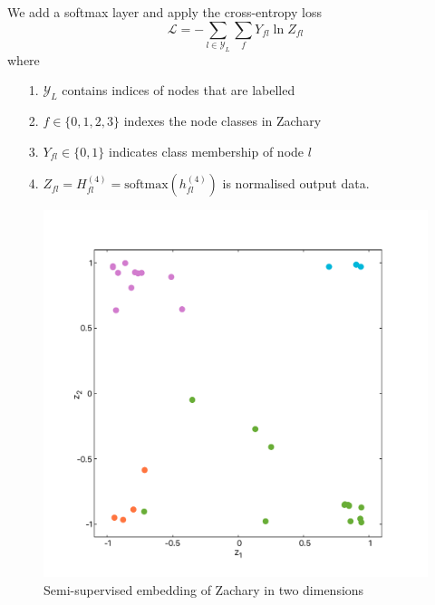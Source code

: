\documentclass[mathserif,10pt]{beamer}
\begin{document}
\begin{frame}
We add a softmax layer and apply the cross-entropy loss
\begin{equation}
  \mathcal{L} = -\sum_{l \in \mathcal{Y}_L} \sum_f Y_{fl} \ln Z_{fl}
\end{equation}
where 
\begin{itemize}
  \item[1.] $\mathcal{Y}_L$ contains indices of nodes that are labelled
  \item[2.] $f \in \lbrace 0, 1, 2, 3 \rbrace$ indexes the node classes in Zachary 
  \item[3.] $Y_{fl} \in \lbrace 0, 1\rbrace$ indicates class membership of node $l$
  \item[4.] $Z_{fl} = H^{(4)}_{fl} = \text{softmax}(h_{fl}^{(4)})$ is normalised output data.
\end{itemize}
\end{frame}

\begin{frame}
  \begin{figure}
    \includegraphics[scale=0.30]{figs/fig02c.pdf}
    \caption{Semi-supervised embedding of Zachary in two dimensions}
  \end{figure}
\end{frame}
  
\end{document}
